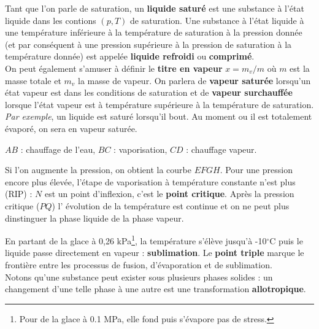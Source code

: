 Tant que l'on parle de saturation, un \textbf{liquide saturé} est une 
substance à l'état liquide dans les contions $(p,T)$ de saturation. 
Une substance à l’état liquide à une température inférieure à la 
température de saturation à la pression donnée (et par conséquent à 
une pression supérieure à la pression de saturation à la température 
donnée) est appelée \textbf{liquide refroidi} ou \textbf{comprimé}.\\

\noindent
On peut également s'amuser à définir le \textbf{titre en vapeur} $
x = m_v/m$ où $m$ est la masse totale et $m_v$ la masse de vapeur. On 
parlera de \textbf{vapeur saturée} lorsqu'un état vapeur est dans les 
conditions de saturation et de \textbf{vapeur surchauffée} lorsque 
l'état vapeur est à température supérieure à la température de 
saturation.
\newpage
\noindent
\textit{Par exemple}, un liquide est saturé lorsqu'il bout. Au moment 
ou il est totalement évaporé, on sera en vapeur saturée.

\begin{center}
$AB$ : chauffage de l'eau, $BC$ : vaporisation, $CD$ : chauffage 
vapeur.
\end{center}
Si l'on augmente la pression, on obtient la courbe $EFGH$. Pour une 
pression encore plus élevée, l'étape de vaporisation à température 
constante n'est plus (RIP) : $N$ est un point d'inflexion, c'est le 
\textbf{point critique}. Après la pression critique ($PQ$) l'
évolution de la température est continue et on ne peut plus 
dinstinguer la phase liquide de la phase vapeur. 

En partant de la glace à 0,26 kPa\footnote{Pour de la glace à 0.1 MPa, 
elle fond puis s'évapore pas de stress.}, la température s'élève jusqu'à 
-10$^\circ$C puis le liquide passe directement en vapeur : \textbf{
sublimation}. Le \textbf{point triple} marque le frontière entre 
les processus de fusion, d'évaporation et de sublimation.\\

\noindent
Notons qu'une substance peut exister sous plusieurs phases solides : 
un changement d'une telle phase à une autre est une transformation 
\textbf{allotropique}.